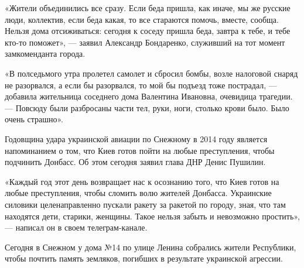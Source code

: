 «Жители объединились все сразу. Если беда пришла, как иначе, мы же русские
люди, коллектив, если беда какая, то все стараются помочь, вместе, сообща.
Нельзя дома отсиживаться: сегодня к соседу пришла беда, завтра к тебе, и тебе
кто-то поможет», --- заявил Александр Бондаренко, служивший на тот момент
замкоменданта города.

«В полседьмого утра пролетел самолет и сбросил бомбы, возле налоговой снаряд не
разорвался, а если бы разорвался, то мой бы подъезд тоже пострадал, --- добавила
жительница соседнего дома Валентина Ивановна, очевидица трагедии. --- Повсюду
были разбросаны части тел, руки, ноги, столько крови было. Было очень страшно».

Годовщина удара украинской авиации по Снежному в 2014 году является
напоминанием о том, что Киев готов пойти на любые преступления, чтобы подчинить
Донбасс. Об этом сегодня заявил глава ДНР Денис Пушилин.

«Каждый год этот день возвращает нас к осознанию того, что Киев готов на любые
преступления, чтобы сломить волю жителей Донбасса. Украинские силовики
целенаправленно пускали ракету за ракетой по городу, зная, что там находятся
дети, старики, женщины. Такое нельзя забыть и невозможно простить», --- написал
он в своем телеграм-канале.

Сегодня в Снежном у дома №14 по улице Ленина собрались жители Республики, чтобы
почтить память земляков, погибших в результате украинской агрессии.


